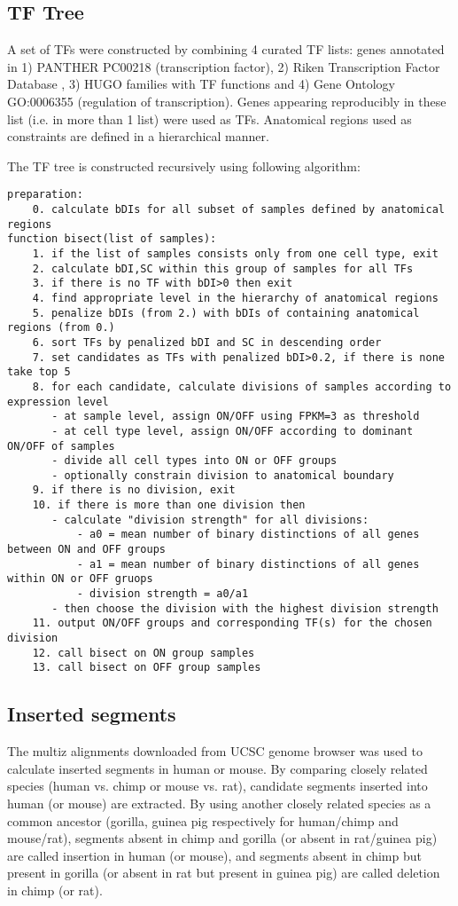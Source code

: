 \subsection{TF Tree}
A set of TFs were constructed by combining 4 curated TF lists: genes annotated in 1) PANTHER \citep{Thomas_2003} PC00218 (transcription factor), 2) Riken Transcription Factor Database \citep{Kanamori_2004}, 3) HUGO \citep{Gray_2014} families with TF functions and 4) Gene Ontology \citep{Ashburner_2000} GO:0006355 (regulation of transcription). Genes appearing reproducibly in these list (i.e. in more than 1 list) were used as TFs. Anatomical regions used as constraints are defined in a hierarchical manner. 

The TF tree is constructed recursively using following algorithm:
\begin{verbatim}
preparation:
    0. calculate bDIs for all subset of samples defined by anatomical regions
function bisect(list of samples):
    1. if the list of samples consists only from one cell type, exit
    2. calculate bDI,SC within this group of samples for all TFs
    3. if there is no TF with bDI>0 then exit
    4. find appropriate level in the hierarchy of anatomical regions
    5. penalize bDIs (from 2.) with bDIs of containing anatomical regions (from 0.)
    6. sort TFs by penalized bDI and SC in descending order
    7. set candidates as TFs with penalized bDI>0.2, if there is none take top 5
    8. for each candidate, calculate divisions of samples according to expression level
       - at sample level, assign ON/OFF using FPKM=3 as threshold
       - at cell type level, assign ON/OFF according to dominant ON/OFF of samples
       - divide all cell types into ON or OFF groups
       - optionally constrain division to anatomical boundary
    9. if there is no division, exit
    10. if there is more than one division then
       - calculate "division strength" for all divisions:
           - a0 = mean number of binary distinctions of all genes between ON and OFF groups
           - a1 = mean number of binary distinctions of all genes within ON or OFF gruops
           - division strength = a0/a1
       - then choose the division with the highest division strength
    11. output ON/OFF groups and corresponding TF(s) for the chosen division
    12. call bisect on ON group samples
    13. call bisect on OFF group samples
\end{verbatim}

\subsection{Inserted segments}
The multiz alignments downloaded from UCSC genome browser \citep{Kent_2002} was used to calculate inserted segments in human or mouse. By comparing closely related species (human vs. chimp or mouse vs. rat), candidate segments inserted into human (or mouse) are extracted. By using another closely related species as a common ancestor (gorilla, guinea pig respectively for human/chimp and mouse/rat), segments absent in chimp and gorilla (or absent in rat/guinea pig) are called insertion in human (or mouse), and segments absent in chimp but present in gorilla (or absent in rat but present in guinea pig) are called deletion in chimp (or rat). 

